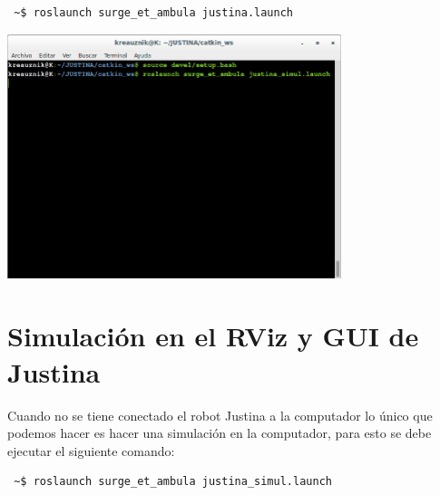 \documentclass[user_manual.tex]{subfiles}
\begin{document}
\begin{verbatim}
 ~$ roslaunch surge_et_ambula justina.launch
\end{verbatim}

 \begin{center}
\includegraphics[width=0.73\textwidth]{Figures/PP/pp6.png}
\end{center}
\section{Simulación en el RViz y GUI de Justina}
Cuando no se tiene conectado el robot Justina a la computador lo único que podemos hacer
es hacer una simulación en la computador, para esto se debe ejecutar el siguiente comando:
\begin{verbatim}
 ~$ roslaunch surge_et_ambula justina_simul.launch
\end{verbatim}
\end{document}
